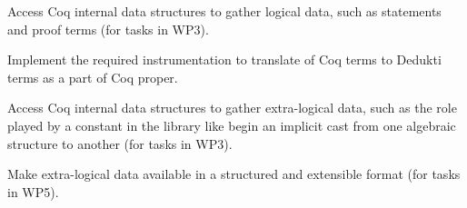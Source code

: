 \begin{workpackage}
\begin{tasklist}
\begin{task}[id=coq,
  title=Instrument Coq,
  lead=Bol,
  BolRM=12,
  InrRM=6,
  wphases=0-8]
\begin{compactitem}
\item Access Coq internal data structures to gather logical data, such as
statements and proof terms (for tasks in WP3).
\item Implement the required instrumentation to translate of Coq terms
to Dedukti terms as a part of Coq proper.
\item Access Coq internal data structures to gather extra-logical data,
such as the role played by a constant in the library like begin an implicit
cast from one algebraic structure to another (for tasks in WP3).
\item Make extra-logical data available in a structured and
  extensible format (for tasks in WP5).
\end{compactitem}
\end{task}
\end{tasklist}


\end{workpackage}
